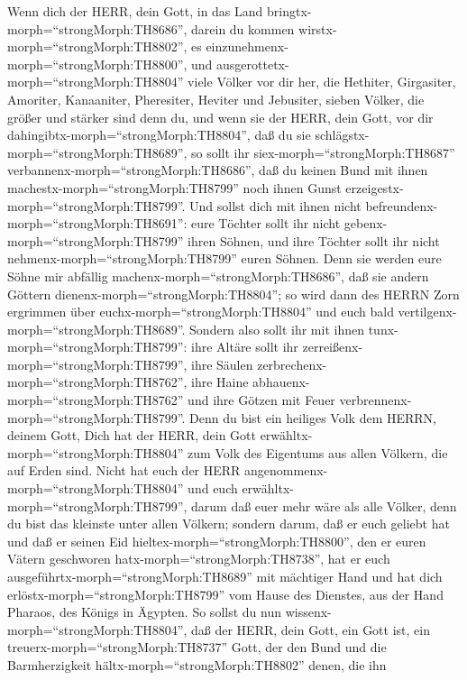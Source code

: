  Wenn dich der HERR, dein Gott, in das Land
bringtx-morph=``strongMorph:TH8686'', darein du kommen
wirstx-morph=``strongMorph:TH8802'', es
einzunehmenx-morph=``strongMorph:TH8800'', und
ausgerottetx-morph=``strongMorph:TH8804'' viele Völker vor dir her, die
Hethiter, Girgasiter, Amoriter, Kanaaniter, Pheresiter, Heviter und
Jebusiter, sieben Völker, die größer und stärker sind denn du,
 und wenn sie der HERR, dein Gott, vor dir
dahingibtx-morph=``strongMorph:TH8804'', daß du sie
schlägstx-morph=``strongMorph:TH8689'', so sollt ihr
siex-morph=``strongMorph:TH8687''
verbannenx-morph=``strongMorph:TH8686'', daß du keinen Bund mit ihnen
machestx-morph=``strongMorph:TH8799'' noch ihnen Gunst
erzeigestx-morph=``strongMorph:TH8799''.  Und sollst dich
mit ihnen nicht befreundenx-morph=``strongMorph:TH8691'': eure Töchter
sollt ihr nicht gebenx-morph=``strongMorph:TH8799'' ihren Söhnen, und
ihre Töchter sollt ihr nicht nehmenx-morph=``strongMorph:TH8799'' euren
Söhnen.  Denn sie werden eure Söhne mir abfällig
machenx-morph=``strongMorph:TH8686'', daß sie andern Göttern
dienenx-morph=``strongMorph:TH8804''; so wird dann des HERRN Zorn
ergrimmen über euchx-morph=``strongMorph:TH8804'' und euch bald
vertilgenx-morph=``strongMorph:TH8689''.  Sondern also sollt
ihr mit ihnen tunx-morph=``strongMorph:TH8799'': ihre Altäre sollt ihr
zerreißenx-morph=``strongMorph:TH8799'', ihre Säulen
zerbrechenx-morph=``strongMorph:TH8762'', ihre Haine
abhauenx-morph=``strongMorph:TH8762'' und ihre Götzen mit Feuer
verbrennenx-morph=``strongMorph:TH8799''.  Denn du bist ein
heiliges Volk dem HERRN, deinem Gott, Dich hat der HERR, dein Gott
erwähltx-morph=``strongMorph:TH8804'' zum Volk des Eigentums aus allen
Völkern, die auf Erden sind.  Nicht hat euch der HERR
angenommenx-morph=``strongMorph:TH8804'' und euch
erwähltx-morph=``strongMorph:TH8799'', darum daß euer mehr wäre als alle
Völker, denn du bist das kleinste unter allen Völkern; 
sondern darum, daß er euch geliebt hat und daß er seinen Eid
hieltex-morph=``strongMorph:TH8800'', den er euren Vätern geschworen
hatx-morph=``strongMorph:TH8738'', hat er euch
ausgeführtx-morph=``strongMorph:TH8689'' mit mächtiger Hand und hat dich
erlöstx-morph=``strongMorph:TH8799'' vom Hause des Dienstes, aus der
Hand Pharaos, des Königs in Ägypten.  So sollst du nun
wissenx-morph=``strongMorph:TH8804'', daß der HERR, dein Gott, ein Gott
ist, ein treuerx-morph=``strongMorph:TH8737'' Gott, der den Bund und die
Barmherzigkeit hältx-morph=``strongMorph:TH8802'' denen, die ihn
